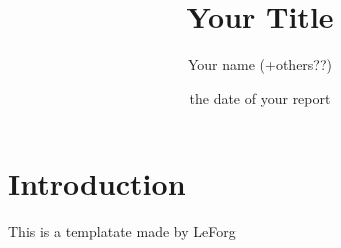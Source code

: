 \documentclass[10pt]{report}
\title{\Huge\bfseries{Your Title}}
\author{Your name (+others??)}
\date{the date of your report}
\begin{document}
\maketitle
\tableofcontents
\listoffigures

\chapter*{Introduction}

\large{
  This is a templatate made by LeForg \cite{leforg}
}



\normalsize


\newpage





\appendix



\end{document}

